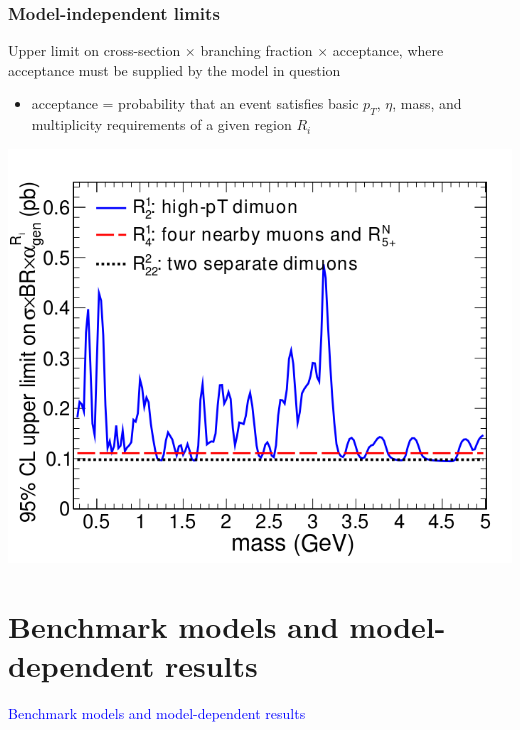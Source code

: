 \documentclass[compress]{beamer}
\begin{document}
\begin{frame}
\frametitle{Model-independent limits}

Upper limit on cross-section $\times$ branching fraction $\times$
acceptance, where acceptance must be supplied by the model in question
\begin{itemize}
\item acceptance = probability that an event satisfies basic $p_T$,
  $\eta$, mass, and multiplicity requirements of a given region $R_i$
\end{itemize}

\vspace{-0.5 cm}
\begin{center}
\includegraphics[width=0.65\linewidth]{ul__model_indep_sys.png}
\end{center}
\vspace{-0.7 cm}
\end{frame}

\section*{Benchmark models and model-dependent results}
\begin{frame}
\begin{center}
\Huge \textcolor{blue}{Benchmark models and model-dependent results}
\end{center}
\end{frame}
\end{document}
